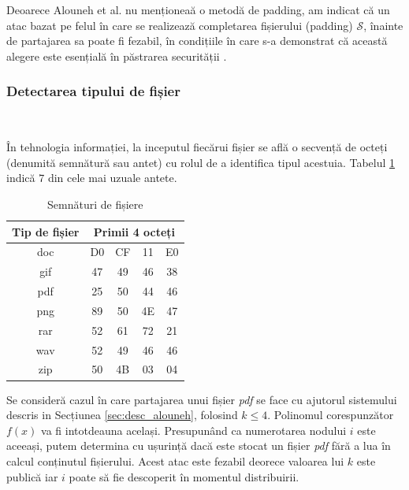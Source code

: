 \documentclass[oneside, 12pt]{book}
\begin{document}
Deoarece Alouneh et al. nu menționeaă o metodă de padding, am indicat că un atac bazat pe felul în care se realizează completarea fișierului (padding) $\mathcal{S}$, înainte de partajarea sa poate fi fezabil, în condițiile în care s-a demonstrat că această alegere este esențială în păstrarea securității \cite{Vaudenay:2002}.

\subsubsection{Detectarea tipului de fișier}\hspace*{\fill} \\
\label{subsec:file_type_detection}

În tehnologia informației, la inceputul fiecărui fișier se află o secvență de octeți (denumită semnătură sau antet) cu rolul de a identifica tipul acestuia. Tabelul {\ref{table:sign}} indică $7$ din cele mai uzuale antete.


\begin{table}[b]
\bigskip
\begin{center}
\caption{Semnături de fișiere}\label{tb:margins}
\label{table:sign}
\begin{tabular}{ccccc}
Tip de fișier &  \multicolumn{4}{c}{Primii 4 octeți}\\ \hline 
doc &  D0 & CF & 11 & E0\\
gif & 47 & 49 & 46 & 38 \\
pdf & 25 & 50 & 44 & 46 \\
png & 89 & 50 & 4E & 47 \\
rar & 52 & 61 & 72 & 21 \\
wav & 52 & 49 & 46 & 46 \\
zip & 50 & 4B & 03 & 04\\  \hline
\end{tabular}
\end{center}
\bigskip
\end{table}

Se consideră cazul în care partajarea unui fișier \textit{pdf} se face cu ajutorul sistemului descris in {S}ecțiunea \ref{sec:desc_alouneh}, folosind $k \leq 4$. Polinomul corespunzător $f(x)$ va fi intotdeauna același. Presupunând ca numerotarea nodului $i$ este aceeași, putem determina cu ușurință dacă este stocat un fișier \textit{pdf} fără a lua în calcul conținutul fișierului.
Acest atac este fezabil deorece valoarea lui $k$ este publică iar $i$ poate să fie descoperit în momentul distribuirii.
\end{document}
